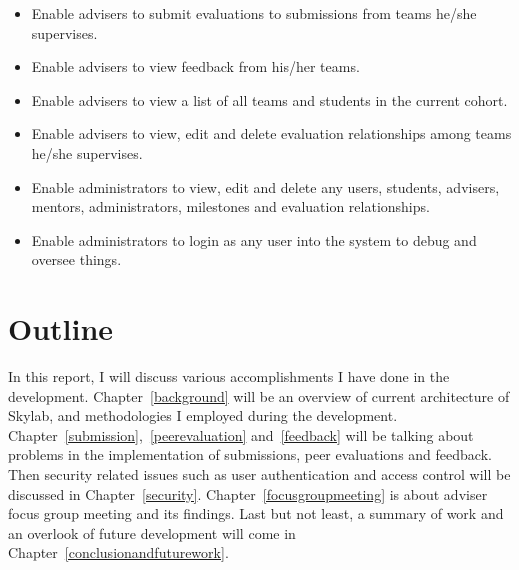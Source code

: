 \begin{itemize}
  \item Enable advisers to submit evaluations to submissions from teams he/she supervises.
  \item Enable advisers to view feedback from his/her teams.
  \item Enable advisers to view a list of all teams and students in the current cohort.
  \item Enable advisers to view, edit and delete evaluation relationships among teams he/she supervises.
  \item Enable administrators to view, edit and delete any users, students, advisers, mentors, administrators, milestones and evaluation relationships.
  \item Enable administrators to login as any user into the system to debug and oversee things.
\end{itemize}

\section{Outline}

In this report, I will discuss various accomplishments I have done in the development. Chapter~\ref{background} will be an overview of current architecture of Skylab, and methodologies I employed during the development. Chapter~\ref{submission},~\ref{peerevaluation} and~\ref{feedback} will be talking about problems in the implementation of submissions, peer evaluations and feedback. Then security related issues such as user authentication and access control will be discussed in Chapter~\ref{security}. Chapter~\ref{focusgroupmeeting} is about adviser focus group meeting and its findings. Last but not least, a summary of work and an overlook of future development will come in Chapter~\ref{conclusionandfuturework}.
